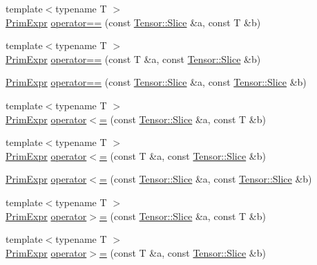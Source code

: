 \begin{DoxyCompactItemize}
\item 
{\footnotesize template$<$typename T $>$ }\\\hyperlink{classtvm_1_1PrimExpr}{Prim\+Expr} \hyperlink{namespacetvm_1_1te_a5d186948df24bd18a8aef7eee3b37727}{operator==} (const \hyperlink{classtvm_1_1te_1_1Tensor_1_1Slice}{Tensor\+::\+Slice} \&a, const T \&b)
\item 
{\footnotesize template$<$typename T $>$ }\\\hyperlink{classtvm_1_1PrimExpr}{Prim\+Expr} \hyperlink{namespacetvm_1_1te_a640a91e87c3d3a55c5df248c1a194b90}{operator==} (const T \&a, const \hyperlink{classtvm_1_1te_1_1Tensor_1_1Slice}{Tensor\+::\+Slice} \&b)
\item 
\hyperlink{classtvm_1_1PrimExpr}{Prim\+Expr} \hyperlink{namespacetvm_1_1te_a643184f062c87081a55f9e4ba0e6d0d6}{operator==} (const \hyperlink{classtvm_1_1te_1_1Tensor_1_1Slice}{Tensor\+::\+Slice} \&a, const \hyperlink{classtvm_1_1te_1_1Tensor_1_1Slice}{Tensor\+::\+Slice} \&b)
\item 
{\footnotesize template$<$typename T $>$ }\\\hyperlink{classtvm_1_1PrimExpr}{Prim\+Expr} \hyperlink{namespacetvm_1_1te_a155868a829cdec5e04c00fee9fd6b8ab}{operator$<$=} (const \hyperlink{classtvm_1_1te_1_1Tensor_1_1Slice}{Tensor\+::\+Slice} \&a, const T \&b)
\item 
{\footnotesize template$<$typename T $>$ }\\\hyperlink{classtvm_1_1PrimExpr}{Prim\+Expr} \hyperlink{namespacetvm_1_1te_a9049756f490d96b37d24fb4a4d019d6e}{operator$<$=} (const T \&a, const \hyperlink{classtvm_1_1te_1_1Tensor_1_1Slice}{Tensor\+::\+Slice} \&b)
\item 
\hyperlink{classtvm_1_1PrimExpr}{Prim\+Expr} \hyperlink{namespacetvm_1_1te_ae7fe819e0a6e9615e65cabfe5058b498}{operator$<$=} (const \hyperlink{classtvm_1_1te_1_1Tensor_1_1Slice}{Tensor\+::\+Slice} \&a, const \hyperlink{classtvm_1_1te_1_1Tensor_1_1Slice}{Tensor\+::\+Slice} \&b)
\item 
{\footnotesize template$<$typename T $>$ }\\\hyperlink{classtvm_1_1PrimExpr}{Prim\+Expr} \hyperlink{namespacetvm_1_1te_a54c35df3fc069cb65ad6e28fa6b35109}{operator$>$=} (const \hyperlink{classtvm_1_1te_1_1Tensor_1_1Slice}{Tensor\+::\+Slice} \&a, const T \&b)
\item 
{\footnotesize template$<$typename T $>$ }\\\hyperlink{classtvm_1_1PrimExpr}{Prim\+Expr} \hyperlink{namespacetvm_1_1te_a5cbaee6b481ab46d55c17206e2487eed}{operator$>$=} (const T \&a, const \hyperlink{classtvm_1_1te_1_1Tensor_1_1Slice}{Tensor\+::\+Slice} \&b)

\end{DoxyCompactItemize}
